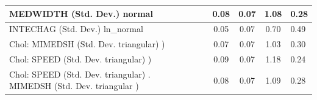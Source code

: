 \begin{table}
\begin{center}
\begin{tabular}{|l|l|c|c|c|l|}
			\hline
			MEDWIDTH (Std. Dev.) normal &  & 0.08 & 0.07 & 1.08 & 0.28 \\
			\hline
			INTECHAG (Std. Dev.) ln_normal &  & 0.05 & 0.07 & 0.70 & 0.49 \\
			\hline
			 Chol: MIMEDSH (Std. Dev. triangular) ) &  & 0.07 & 0.07 & 1.03 & 0.30 \\
			\hline
			 Chol: SPEED (Std. Dev. triangular) ) &  & 0.09 & 0.07 & 1.18 & 0.24 \\
			\hline
			 Chol: SPEED (Std. Dev. triangular) . MIMEDSH (Std. Dev.   triangular ) &  & 0.08 & 0.07 & 1.09 & 0.28 \\
			\hline
		\end{tabular}
	\end{center}
\end{table}
